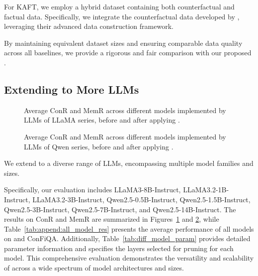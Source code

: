 For KAFT, we employ a hybrid dataset containing both counterfactual and factual data. Specifically, we integrate the counterfactual data developed by \citet{xie2023adaptive}, leveraging their advanced data construction framework.

By maintaining equivalent dataset sizes and ensuring comparable data quality across all baselines, we provide a rigorous and fair comparison with our proposed \method{}.




\subsection{Extending \method{} to More LLMs}
\label{append:diff_model_performance}


\begin{figure}[t!]
  \centering
  
 \caption{Average ConR and MemR across different models implemented by LLMs of LLaMA series, before and after applying \method{}.
 }
 \label{fig:diff_model_double_llama}
\end{figure}

\begin{figure}[t]
  \centering
  
 \caption{Average ConR and MemR across different models implemented by LLMs of Qwen series, before and after applying \method{}.
 }
 \label{fig:diff_model_double_qwen}
\end{figure}






We extend \method{} to a diverse range of LLMs, encompassing multiple model families and sizes. 

Specifically, our evaluation includes LLaMA3-8B-Instruct, LLaMA3.2-1B-Instruct, LLaMA3.2-3B-Instruct, Qwen2.5-0.5B-Instruct, Qwen2.5-1.5B-Instruct, Qwen2.5-3B-Instruct, Qwen2.5-7B-Instruct, and Qwen2.5-14B-Instruct. The results on ConR and MemR are summarized in Figures~\ref{fig:diff_model_double_llama} and \ref{fig:diff_model_double_qwen}, while Table~\ref{tab:append:all_model_res} presents the average performance of all models on \dataset{} and ConFiQA. Additionally, Table~\ref{tab:diff_model_param} provides detailed parameter information and specifies the layers selected for pruning for each model. This comprehensive evaluation demonstrates the versatility and scalability of \method{} across a wide spectrum of model architectures and sizes.

